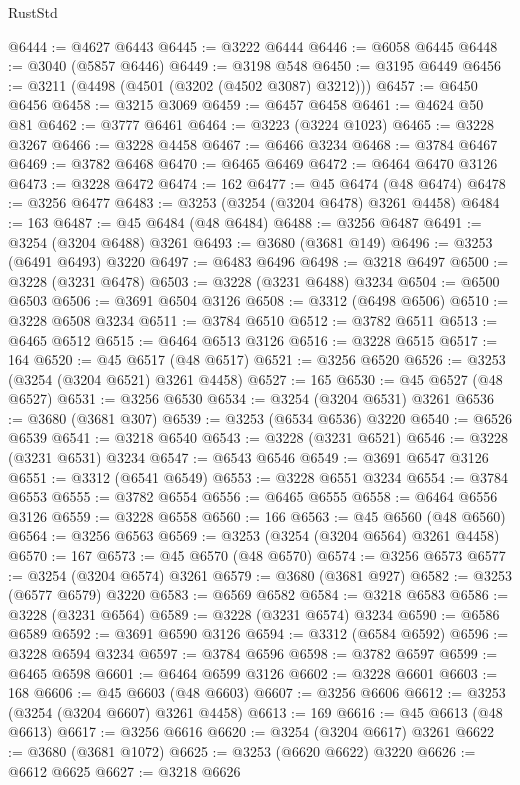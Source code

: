 \begin{lexlean}{RustStd}
\begin{coremodule}
@6444 := @4627 @6443
@6445 := @3222 @6444
@6446 := @6058 @6445
@6448 := @3040 (@5857 @6446)
@6449 := @3198 @548
@6450 := @3195 @6449
@6456 := @3211 (@4498 (@4501 (@3202 (@4502 @3087) @3212)))
@6457 := @6450 @6456
@6458 := @3215 @3069
@6459 := @6457 @6458
@6461 := @4624 @50 @81
@6462 := @3777 @6461
@6464 := @3223 (@3224 @1023)
@6465 := @3228 @3267
@6466 := @3228 @4458
@6467 := @6466 @3234
@6468 := @3784 @6467
@6469 := @3782 @6468
@6470 := @6465 @6469
@6472 := @6464 @6470 @3126
@6473 := @3228 @6472
@6474 := 162
@6477 := @45 @6474 (@48 @6474)
@6478 := @3256 @6477
@6483 := @3253 (@3254 (@3204 @6478) @3261 @4458)
@6484 := 163
@6487 := @45 @6484 (@48 @6484)
@6488 := @3256 @6487
@6491 := @3254 (@3204 @6488) @3261
@6493 := @3680 (@3681 @149)
@6496 := @3253 (@6491 @6493) @3220
@6497 := @6483 @6496
@6498 := @3218 @6497
@6500 := @3228 (@3231 @6478)
@6503 := @3228 (@3231 @6488) @3234
@6504 := @6500 @6503
@6506 := @3691 @6504 @3126
@6508 := @3312 (@6498 @6506)
@6510 := @3228 @6508 @3234
@6511 := @3784 @6510
@6512 := @3782 @6511
@6513 := @6465 @6512
@6515 := @6464 @6513 @3126
@6516 := @3228 @6515
@6517 := 164
@6520 := @45 @6517 (@48 @6517)
@6521 := @3256 @6520
@6526 := @3253 (@3254 (@3204 @6521) @3261 @4458)
@6527 := 165
@6530 := @45 @6527 (@48 @6527)
@6531 := @3256 @6530
@6534 := @3254 (@3204 @6531) @3261
@6536 := @3680 (@3681 @307)
@6539 := @3253 (@6534 @6536) @3220
@6540 := @6526 @6539
@6541 := @3218 @6540
@6543 := @3228 (@3231 @6521)
@6546 := @3228 (@3231 @6531) @3234
@6547 := @6543 @6546
@6549 := @3691 @6547 @3126
@6551 := @3312 (@6541 @6549)
@6553 := @3228 @6551 @3234
@6554 := @3784 @6553
@6555 := @3782 @6554
@6556 := @6465 @6555
@6558 := @6464 @6556 @3126
@6559 := @3228 @6558
@6560 := 166
@6563 := @45 @6560 (@48 @6560)
@6564 := @3256 @6563
@6569 := @3253 (@3254 (@3204 @6564) @3261 @4458)
@6570 := 167
@6573 := @45 @6570 (@48 @6570)
@6574 := @3256 @6573
@6577 := @3254 (@3204 @6574) @3261
@6579 := @3680 (@3681 @927)
@6582 := @3253 (@6577 @6579) @3220
@6583 := @6569 @6582
@6584 := @3218 @6583
@6586 := @3228 (@3231 @6564)
@6589 := @3228 (@3231 @6574) @3234
@6590 := @6586 @6589
@6592 := @3691 @6590 @3126
@6594 := @3312 (@6584 @6592)
@6596 := @3228 @6594 @3234
@6597 := @3784 @6596
@6598 := @3782 @6597
@6599 := @6465 @6598
@6601 := @6464 @6599 @3126
@6602 := @3228 @6601
@6603 := 168
@6606 := @45 @6603 (@48 @6603)
@6607 := @3256 @6606
@6612 := @3253 (@3254 (@3204 @6607) @3261 @4458)
@6613 := 169
@6616 := @45 @6613 (@48 @6613)
@6617 := @3256 @6616
@6620 := @3254 (@3204 @6617) @3261
@6622 := @3680 (@3681 @1072)
@6625 := @3253 (@6620 @6622) @3220
@6626 := @6612 @6625
@6627 := @3218 @6626

\end{coremodule}
\end{lexlean}
